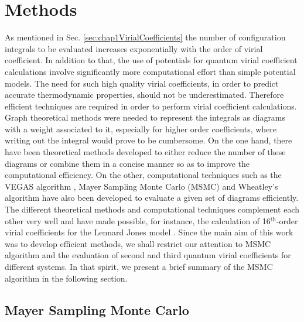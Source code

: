 \chapter{Methods}
\label{chap:methods}
\khExplicitPfalse
\graphicspath{{/home/ram/Desktop/Acads/Phd/dissertation/psuThesis/Chapter-2/Figures/}{/usr/users/rsubrama/Desktop/Acads/Phd/dissertation/psuThesis/Chapter-2/Figures/}}
    As mentioned in Sec. \ref{sec:chap1VirialCoefficients} the number of configuration integrals to be evaluated increases exponentially with the order of virial coefficient. In addition to that, the use of \abinitio{} potentials for quantum virial coefficient calculations involve significantly more computational effort than simple potential models. The need for such high quality virial coefficients, in order to predict accurate thermodynamic properties, should not be underestimated. Therefore efficient techniques are required in order to perform virial coefficient calculations. Graph theoretical methods were needed to represent the integrals as diagrams with a weight associated to it, especially for higher order coefficients, where writing out the integral would prove to be cumbersome. On the one hand, there have been theoretical methods \cite{Ree1964,Hellmann2011} developed to either reduce the number of these diagrams or combine them in a concise manner so as to improve the computational efficiency. On the other, computational techniques such as the VEGAS algorithm \cite{Lepage1972}, Mayer Sampling Monte Carlo (MSMC) \cite{Singh2004} and Wheatley's algorithm \cite{Wheatley2013} have also been developed to evaluate a given set of diagrams efficiently. The different theoretical methods and computational techniques complement each other very well and have made possible, for instance, the calculation of 16$^{\text{th}}$-order virial coefficients for the Lennard Jones model \cite{Feng2015}. Since the main aim of this work was to develop efficient methods, we shall restrict our attention to MSMC algorithm and the evaluation of second and third quantum virial coefficients for different systems. In that spirit, we present a brief summary of the MSMC algorithm in the following section.

\section{Mayer Sampling Monte Carlo}
    \label{sec:MSMC}
